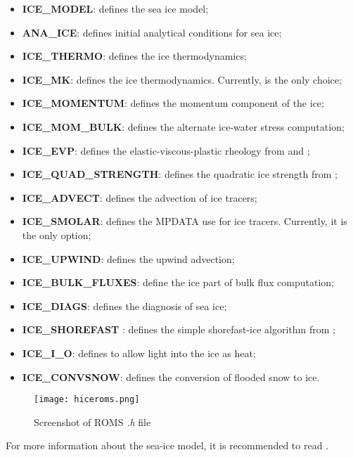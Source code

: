 \begin{itemize}
    \item \textbf{ICE\_MODEL}: defines the sea ice model;
    \item \textbf{ANA\_ICE}: defines initial analytical conditions for sea ice;
    \item \textbf{ICE\_THERMO}: defines the ice thermodynamics;
    \item \textbf{ICE\_MK}: defines the \textcite{Mellor1989} ice thermodynamics. Currently, is the only choice;
    \item \textbf{ICE\_MOMENTUM}: defines the momentum component of the ice;
    \item \textbf{ICE\_MOM\_BULK}: defines the alternate ice-water stress computation;
    \item \textbf{ICE\_EVP}: defines the elastic-viscous-plastic rheology from \textcite{Hunke1997} and \textcite{Hunke2001};
    \item \textbf{ICE\_QUAD\_STRENGTH}: defines the quadratic ice strength from \textcite{Overland1988};
    \item \textbf{ICE\_ADVECT}: defines the advection of ice tracers;
    \item \textbf{ICE\_SMOLAR}: defines the MPDATA use for ice tracers. Currently, it is the only option;
    \item \textbf{ICE\_UPWIND}: defines the upwind advection;
    \item \textbf{ICE\_BULK\_FLUXES}: define the ice part of bulk flux computation;
    \item \textbf{ICE\_DIAGS}: defines the diagnosis of sea ice;
    \item \textbf{ICE\_SHOREFAST} : defines the simple shorefast-ice algorithm from \textcite{Budgell2005};
    \item \textbf{ICE\_I\_O}: defines to allow light into the ice as heat;
    \item \textbf{ICE\_CONVSNOW}: defines the conversion of flooded snow to ice.
\end{itemize}
\bigskip

\begin{figure}[H]
    \centering
    \texttt{[image: hiceroms.png]}
    \caption{Screenshot of ROMS \textit{.h} file}
    \label{hiceroms}
\end{figure}
\bigskip

\begin{tcolorbox}[enhanced,
    grow to left by   = 0cm,
    grow to right by  = 0cm,
    enlarge top by    = 0cm,
    enlarge bottom by = 0cm,
    tcbox raise base,
    boxrule           = 1.0pt,
    left              = 18mm,
    colframe          = green!50!black,coltext=green!25!black,colback=green!10!white,
    overlay           = {\begin{tcbclipinterior}\fill[green!75!blue!50!white] (frame.south west)
      rectangle node[text=white,font=\sffamily\bfseries\footnotesize,rotate=0] {WARNING} ([xshift=18mm]frame.north west);\end{tcbclipinterior}}]
For more information about the sea-ice model, it is recommended to read \textcite{hedstrom2018}.
\end{tcolorbox}
\bigskip

